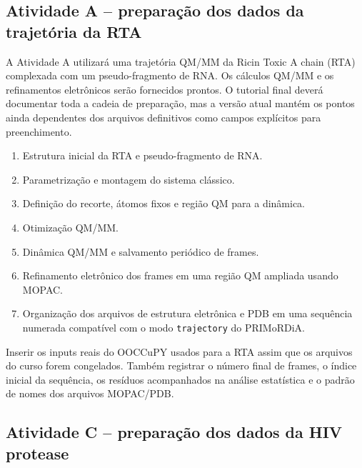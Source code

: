 \documentclass[a4paper,11pt]{refart}
\newcommand{\code}[1]{\texttt{#1}}
\begin{document}
\subsection{Atividade A -- preparação dos dados da trajetória da RTA}

A Atividade A utilizará uma trajetória QM/MM da Ricin Toxic A chain (RTA) complexada com um pseudo-fragmento de RNA. Os cálculos QM/MM e os refinamentos eletrônicos serão fornecidos prontos. O tutorial final deverá documentar toda a cadeia de preparação, mas a versão atual mantém os pontos ainda dependentes dos arquivos definitivos como campos explícitos para preenchimento.

\begin{enumerate}
    \item Estrutura inicial da RTA e pseudo-fragmento de RNA.
    \item Parametrização e montagem do sistema clássico.
    \item Definição do recorte, átomos fixos e região QM para a dinâmica.
    \item Otimização QM/MM.
    \item Dinâmica QM/MM e salvamento periódico de frames.
    \item Refinamento eletrônico dos frames em uma região QM ampliada usando MOPAC.
    \item Organização dos arquivos de estrutura eletrônica e PDB em uma sequência numerada compatível com o modo \code{trajectory} do PRIMoRDiA.
\end{enumerate}

\begin{todobox}
Inserir os inputs reais do OOCCuPY usados para a RTA assim que os arquivos do curso forem congelados. Também registrar o número final de frames, o índice inicial da sequência, os resíduos acompanhados na análise estatística e o padrão de nomes dos arquivos MOPAC/PDB.
\end{todobox}

\subsection{Atividade C -- preparação dos dados da HIV protease}
\end{document}
